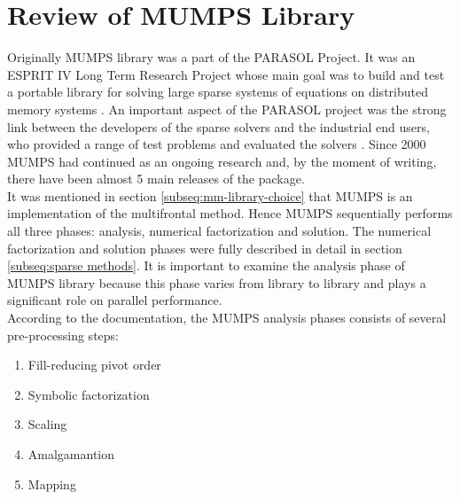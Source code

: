 
\section{Review of MUMPS Library}
\label{subseq:mumps-review}

Originally MUMPS library was a part of the PARASOL Project. It was an ESPRIT IV Long Term Research Project whose main goal was to build and test a portable library for solving large sparse systems of equations on distributed memory systems \cite{PARASOL}. An important aspect of the PARASOL project was the strong link between the developers of the sparse solvers and the industrial end users, who provided a range of test problems and evaluated the solvers \cite{MUMPS:description}. Since 2000 MUMPS had continued as an ongoing research and, by the moment of writing, there have been almost 5 main releases of the package.\\



It was mentioned in section \ref{subseq:mm-library-choice} that MUMPS is an implementation of the multifrontal method. Hence MUMPS sequentially performs all three phases: analysis, numerical factorization and solution. The numerical factorization and solution phases were fully described in detail in section \ref{subseq:sparse methods}. It is important to examine the analysis phase of MUMPS library because this phase varies from library to library and plays a significant role on parallel performance.\\


According to the documentation, the MUMPS analysis phases consists of several pre-processing steps:

\begin{enumerate}
  \item Fill-reducing pivot order \label{mumps:analysis-steps:1}
  \item Symbolic factorization \label{mumps:analysis-steps:2}
  \item Scaling \label{mumps:analysis-steps:3}
  \item Amalgamantion \label{mumps:analysis-steps:4}
  \item Mapping \label{mumps:analysis-steps:5}
\end{enumerate}

